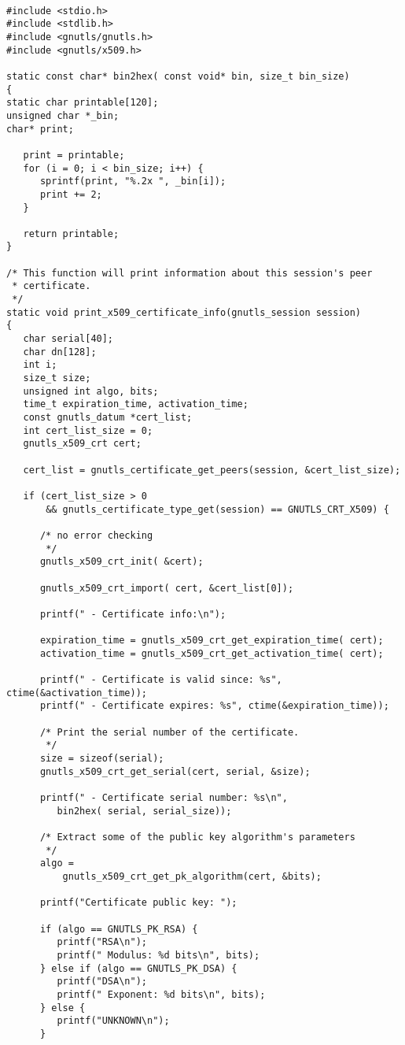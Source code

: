 \begin{verbatim}

#include <stdio.h>
#include <stdlib.h>
#include <gnutls/gnutls.h>
#include <gnutls/x509.h>

static const char* bin2hex( const void* bin, size_t bin_size)
{
static char printable[120];
unsigned char *_bin;
char* print;

   print = printable;
   for (i = 0; i < bin_size; i++) {
      sprintf(print, "%.2x ", _bin[i]);
      print += 2;
   }

   return printable;
}

/* This function will print information about this session's peer
 * certificate. 
 */
static void print_x509_certificate_info(gnutls_session session)
{
   char serial[40];
   char dn[128];
   int i;
   size_t size;
   unsigned int algo, bits;
   time_t expiration_time, activation_time;
   const gnutls_datum *cert_list;
   int cert_list_size = 0;
   gnutls_x509_crt cert;

   cert_list = gnutls_certificate_get_peers(session, &cert_list_size);

   if (cert_list_size > 0
       && gnutls_certificate_type_get(session) == GNUTLS_CRT_X509) {

      /* no error checking
       */
      gnutls_x509_crt_init( &cert);

      gnutls_x509_crt_import( cert, &cert_list[0]);

      printf(" - Certificate info:\n");

      expiration_time = gnutls_x509_crt_get_expiration_time( cert);
      activation_time = gnutls_x509_crt_get_activation_time( cert);

      printf(" - Certificate is valid since: %s", ctime(&activation_time));
      printf(" - Certificate expires: %s", ctime(&expiration_time));

      /* Print the serial number of the certificate.
       */
      size = sizeof(serial);
      gnutls_x509_crt_get_serial(cert, serial, &size);

      printf(" - Certificate serial number: %s\n", 
         bin2hex( serial, serial_size));

      /* Extract some of the public key algorithm's parameters
       */
      algo =
          gnutls_x509_crt_get_pk_algorithm(cert, &bits);

      printf("Certificate public key: ");

      if (algo == GNUTLS_PK_RSA) {
         printf("RSA\n");
         printf(" Modulus: %d bits\n", bits);
      } else if (algo == GNUTLS_PK_DSA) {
         printf("DSA\n");
         printf(" Exponent: %d bits\n", bits);
      } else {
         printf("UNKNOWN\n");
      }


\end{verbatim}
